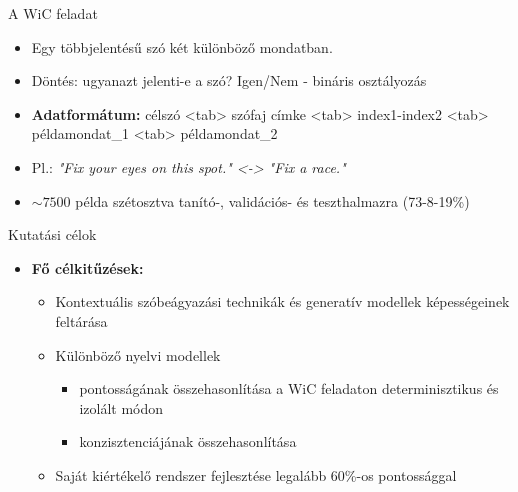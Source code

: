 \documentclass{beamer}
\begin{document}
    \begin{frame}{A WiC feladat}
        \begin{itemize}

            \item Egy többjelentésű szó két különböző mondatban.
            \item Döntés: ugyanazt jelenti-e a szó? Igen/Nem - bináris osztályozás
            \item \textbf{Adatformátum:} célszó <tab> szófaj címke <tab> index1-index2 <tab> példamondat\_1 <tab> példamondat\_2
            \item Pl.: \textit{"Fix your eyes on this spot." <-> "Fix a race."}
            \item $\sim7500$ példa szétosztva tanító-, validációs- és teszthalmazra (73-8-19\%)
        \end{itemize}
    \end{frame}


    \begin{frame}{Kutatási célok}
        \begin{itemize}
            \item \textbf{Fő célkitűzések:}
            \begin{itemize}
                \item Kontextuális szóbeágyazási technikák és generatív modellek képességeinek feltárása
                \item Különböző nyelvi modellek
                \begin{itemize}
                    \item pontosságának összehasonlítása a WiC feladaton determinisztikus és izolált módon
                    \item konzisztenciájának összehasonlítása
                \end{itemize}
                \item Saját kiértékelő rendszer fejlesztése legalább 60\%-os pontossággal
            \end{itemize}
        \end{itemize}
    \end{frame}
\end{document}
